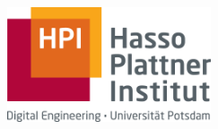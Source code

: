 \begin{titlepage}
    \begin{addmargin}[-1cm]{-3cm}
    \begin{center}
        \large  

        \hfill

        \vfill

        \begingroup
            \color{Maroon}\spacedallcaps{\myTitle} \\ \bigskip
        \endgroup

        \spacedlowsmallcaps{\myName}

        \vfill

        \includegraphics[width=6cm]{frontbackmatter/gfx/hpi_logo.jpg} \\ \medskip

        \myDepartment \\                            
        \myUni \\ \bigskip
        

        \myTime\ %

        \vfill                      

    \end{center}  
  \end{addmargin}       
\end{titlepage}   